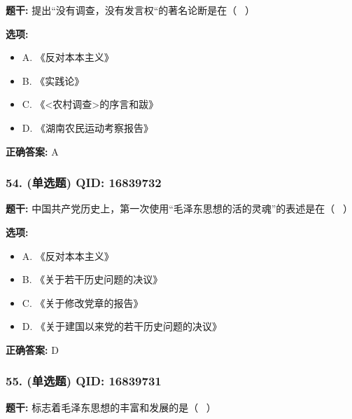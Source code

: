 \documentclass[12pt,UTF8]{ctexart}
\begin{document}
\textbf{题干:}
提出“没有调查，没有发言权“的著名论断是在（  ）

\textbf{选项:}
\begin{itemize}[leftmargin=*]

  \item A. 《反对本本主义》

  \item B. 《实践论》

  \item C. 《<农村调查>的序言和跋》

  \item D. 《湖南农民运动考察报告》

\end{itemize}

\textbf{正确答案:}
A

\vspace{0.3em}\hrulefill\vspace{0.7em}

\subsubsection*{54. (单选题) \small QID: 16839732}

\textbf{题干:}
中国共产党历史上，第一次使用“毛泽东思想的活的灵魂”的表述是在（  ）

\textbf{选项:}
\begin{itemize}[leftmargin=*]

  \item A. 《反对本本主义》

  \item B. 《关于若干历史问题的决议》

  \item C. 《关于修改党章的报告》

  \item D. 《关于建国以来党的若干历史问题的决议》

\end{itemize}

\textbf{正确答案:}
D

\vspace{0.3em}\hrulefill\vspace{0.7em}

\subsubsection*{55. (单选题) \small QID: 16839731}

\textbf{题干:}
标志着毛泽东思想的丰富和发展的是（  ）
\end{document}

